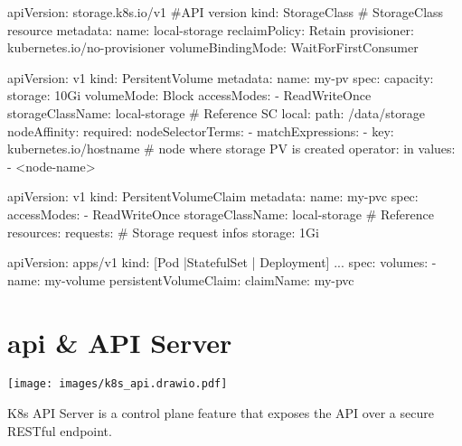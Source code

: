 \documentclass{refcard}
\begin{document}
\begin{yamlbox}[title={Defining a local storage SC}]
  apiVersion: storage.k8s.io/v1 #API version
  kind: StorageClass # StorageClass resource
  metadata:
    name: local-storage
  reclaimPolicy: Retain
  provisioner: kubernetes.io/no-provisioner 
  volumeBindingMode: WaitForFirstConsumer
\end{yamlbox}

\begin{yamlbox}[title={Defining a local storage PV}]
  apiVersion: v1
  kind: PersitentVolume
  metadata:
    name: my-pv
  spec:
    capacity:
      storage: 10Gi
    volumeMode: Block
    accessModes:
    - ReadWriteOnce
    storageClassName: local-storage # Reference SC
    local:
      path: /data/storage
    nodeAffinity:
      required:
        nodeSelectorTerms:
        - matchExpressions:
          - key: kubernetes.io/hostname # node where storage PV is created
            operator: in
            values:
            - <node-name>
\end{yamlbox}

\begin{yamlbox}[title={Defining a local storage PVC}]
  apiVersion: v1
  kind: PersitentVolumeClaim
  metadata:
    name: my-pvc
  spec:
    accessModes:
    - ReadWriteOnce
    storageClassName: local-storage # Reference
    resources:
      requests: # Storage request infos
        storage: 1Gi
\end{yamlbox}

\begin{yamlbox}[title={Using a local storage PVC}]
  apiVersion: apps/v1
  kind: [Pod |StatefulSet | Deployment]
  ...
    spec:
      volumes:
      - name: my-volume
        persistentVolumeClaim:
          claimName: my-pvc
\end{yamlbox}

\section{api \& API Server}

\begin{center}
    \texttt{[image: images/k8s\_api.drawio.pdf]}
\end{center}

K8s API Server is a control plane feature that exposes the API over a secure RESTful endpoint.\\
\end{document}
